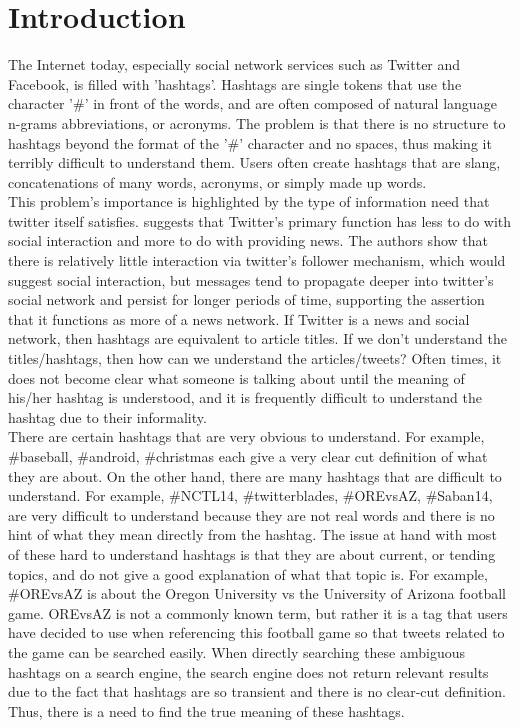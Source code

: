 \documentclass{sig-alternate}
\begin{document}
\section{Introduction}
The Internet today, especially social network services such as Twitter and Facebook, is filled with 'hashtags'. Hashtags are single tokens that use the character '\#' in front of the words, and are often composed of natural language n-grams abbreviations, or acronyms. The problem is that there is no structure to hashtags beyond the format of the '\#' character and no spaces, thus making it terribly difficult to understand them. Users often create hashtags that are slang, concatenations of many words, acronyms, or simply made up words.  \\
This problem's importance is highlighted by the type of information need that twitter itself satisfies.  \cite{twitternews} suggests that Twitter's primary function has less to do with social interaction and more to do with providing news.  The authors show that there is relatively little interaction via twitter's follower mechanism, which would suggest social interaction, but messages tend to propagate deeper into twitter's social network and persist for longer periods of time, supporting the assertion that it functions as more of a news network.  If Twitter is a news and social network, then hashtags are equivalent to article titles.  If we don't understand the titles/hashtags, then how can we understand the articles/tweets? Often times, it does not become clear what someone is talking about until the meaning of his/her hashtag is understood, and it is frequently difficult to understand the hashtag due to their informality. \\
There are certain hashtags that are very obvious to understand. For example, \#baseball, \#android, \#christmas each give a very clear cut definition of what they are about. On the other hand, there are many hashtags that are difficult to understand. For example, \#NCTL14, \#twitterblades, \#OREvsAZ, \#Saban14, are very difficult to understand because they are not real words and there is no hint of what they mean directly from the hashtag. The issue at hand with most of these hard to understand hashtags is that they are about current, or tending topics, and do not give a good explanation of what that topic is. For example, \#OREvsAZ is about the Oregon University vs the University of Arizona football game. OREvsAZ is not a commonly known term, but rather it is a tag that users have decided to use when referencing this football game so that tweets related to the game can be searched easily. When directly searching these ambiguous hashtags on a search engine, the search engine does not return relevant results due to the fact that hashtags are so transient and there is no clear-cut definition. Thus, there is a need to find the true meaning of these hashtags.\\
\end{document}

